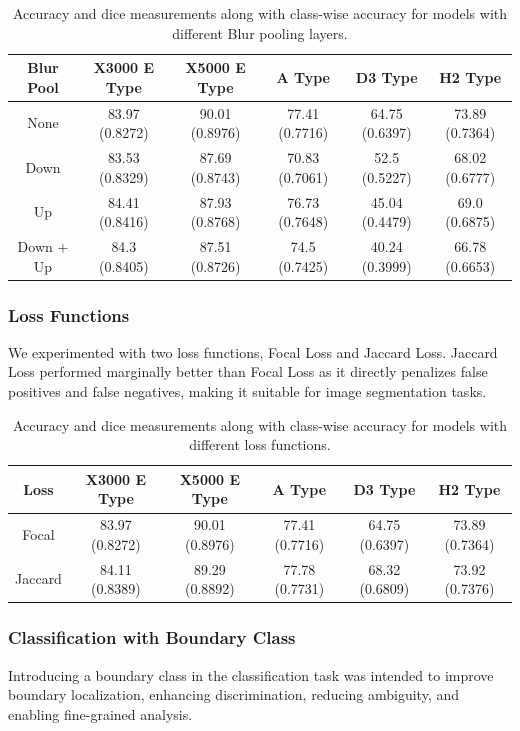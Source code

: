 \documentclass[]{article}
\begin{document}
\begin{table}[h!]
	\centering
	\begin{tabular}{|c|c|c|c|c|c|}
		\hline
		Blur Pool & X3000 E Type & X5000 E Type & A Type & D3 Type & H2 Type \\
		\hline
		\rowcolor{yellow!30} None & 83.97 (0.8272) & 90.01 (0.8976) & 77.41 (0.7716) & 64.75 (0.6397) & 73.89 (0.7364) \\
		Down & 83.53 (0.8329) & 87.69 (0.8743) & 70.83 (0.7061) & 52.5 (0.5227) & 68.02 (0.6777) \\
		Up & 84.41 (0.8416) & 87.93 (0.8768) & 76.73 (0.7648) & 45.04 (0.4479) & 69.0 (0.6875) \\
		Down + Up & 84.3 (0.8405) & 87.51 (0.8726) & 74.5 (0.7425) & 40.24 (0.3999) & 66.78 (0.6653) \\
		\hline
	\end{tabular}
	\caption{Accuracy and dice measurements along with class-wise accuracy for models with different Blur pooling layers.}
\end{table}

\subsubsection{Loss Functions}
We experimented with two loss functions, Focal Loss and Jaccard Loss. Jaccard Loss performed marginally better than Focal Loss as it directly penalizes false positives and false negatives, making it suitable for image segmentation tasks.

\begin{table}[h!]
	\centering
	\begin{tabular}{|c|c|c|c|c|c|}
		\hline
		Loss & X3000 E Type & X5000 E Type & A Type & D3 Type & H2 Type \\
		\hline
		Focal & 83.97 (0.8272) & 90.01 (0.8976) & 77.41 (0.7716) & 64.75 (0.6397) & 73.89 (0.7364) \\
		\rowcolor{yellow!30} Jaccard & 84.11 (0.8389) & 89.29 (0.8892) & 77.78 (0.7731) & 68.32 (0.6809) & 73.92 (0.7376) \\
		\hline
	\end{tabular}
	\caption{Accuracy and dice measurements along with class-wise accuracy for models with different loss functions.}
\end{table}

\subsubsection{Classification with Boundary Class}
Introducing a boundary class in the classification task was intended to improve boundary localization, enhancing discrimination, reducing ambiguity, and enabling fine-grained analysis.
\end{document}
